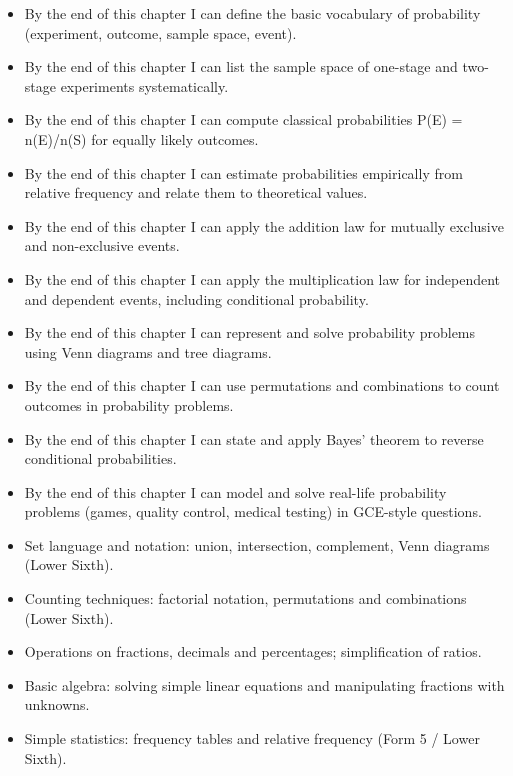 \documentclass[11pt]{article}
\begin{document}
\begin{objectifs}
\begin{itemize}
\item By the end of this chapter I can define the basic vocabulary of probability (experiment, outcome, sample space, event).
\item By the end of this chapter I can list the sample space of one-stage and two-stage experiments systematically.
\item By the end of this chapter I can compute classical probabilities P(E) = n(E)/n(S) for equally likely outcomes.
\item By the end of this chapter I can estimate probabilities empirically from relative frequency and relate them to theoretical values.
\item By the end of this chapter I can apply the addition law for mutually exclusive and non-exclusive events.
\item By the end of this chapter I can apply the multiplication law for independent and dependent events, including conditional probability.
\item By the end of this chapter I can represent and solve probability problems using Venn diagrams and tree diagrams.
\item By the end of this chapter I can use permutations and combinations to count outcomes in probability problems.
\item By the end of this chapter I can state and apply Bayes' theorem to reverse conditional probabilities.
\item By the end of this chapter I can model and solve real-life probability problems (games, quality control, medical testing) in GCE-style questions.
\end{itemize}
\end{objectifs}

\begin{prerequis}
\begin{itemize}
\item Set language and notation: union, intersection, complement, Venn diagrams (Lower Sixth).
\item Counting techniques: factorial notation, permutations and combinations (Lower Sixth).
\item Operations on fractions, decimals and percentages; simplification of ratios.
\item Basic algebra: solving simple linear equations and manipulating fractions with unknowns.
\item Simple statistics: frequency tables and relative frequency (Form 5 / Lower Sixth).
\end{itemize}
\end{prerequis}
\end{document}
